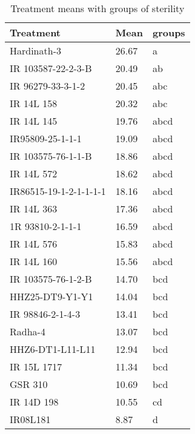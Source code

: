 \documentclass[]{article}
\begin{document}
\begin{longtable}{lll}
\caption{\label{tab:two-fac-groups-tab2}Treatment means with groups of sterility}\\
\toprule
Treatment & Mean & groups\\
\midrule
\rowcolor{gray!6}  Hardinath-3 & 26.67 & a\\
IR 103587-22-2-3-B & 20.49 & ab\\
\rowcolor{gray!6}  IR 96279-33-3-1-2 & 20.45 & abc\\
IR 14L 158 & 20.32 & abc\\
\rowcolor{gray!6}  IR 14L 145 & 19.76 & abcd\\
\addlinespace
IR95809-25-1-1-1 & 19.09 & abcd\\
\rowcolor{gray!6}  IR 103575-76-1-1-B & 18.86 & abcd\\
IR 14L 572 & 18.62 & abcd\\
\rowcolor{gray!6}  IR86515-19-1-2-1-1-1-1 & 18.16 & abcd\\
IR 14L 363 & 17.36 & abcd\\
\addlinespace
\rowcolor{gray!6}  1R 93810-2-1-1-1 & 16.59 & abcd\\
IR 14L 576 & 15.83 & abcd\\
\rowcolor{gray!6}  IR 14L 160 & 15.56 & abcd\\
IR 103575-76-1-2-B & 14.70 & bcd\\
\rowcolor{gray!6}  HHZ25-DT9-Y1-Y1 & 14.04 & bcd\\
\addlinespace
IR 98846-2-1-4-3 & 13.41 & bcd\\
\rowcolor{gray!6}  Radha-4 & 13.07 & bcd\\
HHZ6-DT1-L11-L11 & 12.94 & bcd\\
\rowcolor{gray!6}  IR 15L 1717 & 11.34 & bcd\\
GSR 310 & 10.69 & bcd\\
\addlinespace
\rowcolor{gray!6}  IR 14D 198 & 10.55 & cd\\
IR08L181 & 8.87 & d\\
\bottomrule
\end{longtable}
\endgroup{}
\begingroup\fontsize{12}{14}\selectfont
\end{document}
